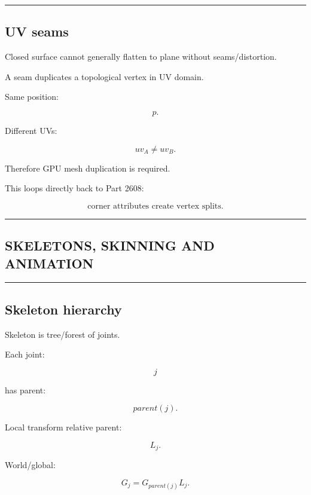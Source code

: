 \begin{center}\rule{0.5\linewidth}{0.5pt}\end{center}

\subsection{UV seams}\label{04-visual-computing-ii-ch041-uv-seams}

Closed surface cannot generally flatten to plane without seams/distortion.

A seam duplicates a topological vertex in UV domain.

Same position:

\[
p.
\]

Different UVs:

\[
uv_A\ne uv_B.
\]

Therefore GPU mesh duplication is required.

This loops directly back to Part 2608:

\[
\boxed{
\text{corner attributes create vertex splits}.
}
\]

\begin{center}\rule{0.5\linewidth}{0.5pt}\end{center}

\subsection{SKELETONS, SKINNING AND ANIMATION}\label{04-visual-computing-ii-ch041-skeletons-skinning-and-animation}

\begin{center}\rule{0.5\linewidth}{0.5pt}\end{center}

\subsection{Skeleton hierarchy}\label{04-visual-computing-ii-ch041-skeleton-hierarchy}

Skeleton is tree/forest of joints.

Each joint:

\[
j
\]

has parent:

\[
parent(j).
\]

Local transform relative parent:

\[
L_j.
\]

World/global:

\[
\boxed{
G_j
=
G_{parent(j)}
L_j.
}
\]

